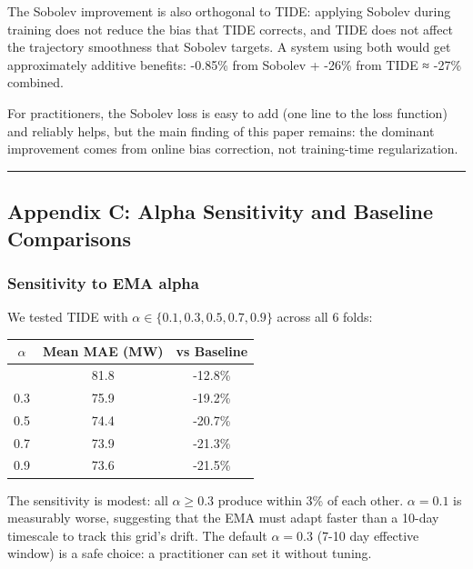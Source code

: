 The Sobolev improvement is also orthogonal to TIDE: applying Sobolev
during training does not reduce the bias that TIDE corrects, and TIDE
does not affect the trajectory smoothness that Sobolev targets. A system
using both would get approximately additive benefits: -0.85\% from
Sobolev + -26\% from TIDE ≈ -27\% combined.

For practitioners, the Sobolev loss is easy to add (one line to the loss
function) and reliably helps, but the main finding of this paper
remains: the dominant improvement comes from online bias correction, not
training-time regularization.

\begin{center}\rule{0.5\linewidth}{0.5pt}\end{center}

\subsection{Appendix C: Alpha Sensitivity and Baseline
Comparisons}\label{appendix-c-alpha-sensitivity-and-baseline-comparisons}

\subsubsection{Sensitivity to EMA alpha}\label{sensitivity-to-ema-alpha}

We tested TIDE with \(\alpha \in \{0.1, 0.3, 0.5, 0.7, 0.9\}\) across
all 6 folds:

{\def\LTcaptype{none} %
\begin{longtable}[]{@{}ccc@{}}
\toprule\noalign{}
\(\alpha\) & Mean MAE (MW) & vs Baseline \\
\midrule\noalign{}
\endhead
\bottomrule\noalign{}
\endlastfoot
0.1 & 81.8 & -12.8\% \\
0.3 & 75.9 & -19.2\% \\
0.5 & 74.4 & -20.7\% \\
0.7 & 73.9 & -21.3\% \\
0.9 & 73.6 & -21.5\% \\
\end{longtable}
}

The sensitivity is modest: all \(\alpha \geq 0.3\) produce within 3\% of
each other. \(\alpha = 0.1\) is measurably worse, suggesting that the
EMA must adapt faster than a 10-day timescale to track this grid's
drift. The default \(\alpha = 0.3\) (7-10 day effective window) is a
safe choice: a practitioner can set it without tuning.


